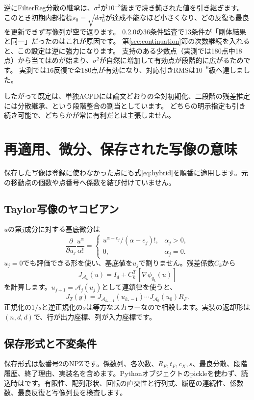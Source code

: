 \documentclass[a4paper,11pt]{article}
\newcommand{\code}[1]{\texttt{\detokenize{#1}}}
\numberwithin{equation}{section}
\begin{document}
逆にFilterReg分散の継承は、\(\sigma^2\)が\(10^{-8}\)級まで焼き鈍された値を引き継ぎます。
このとき初期内部指標\(s_0=\sqrt{d\sigma_0^2}\)が達成不能なほど小さくなり、どの反復も最良を更新できず写像列が空で返ります。
0.2.0の36条件監査で13条件が「剛体結果と同一」だったのはこれが原因です。
第\ref{sec:continuation}節の次数継続を入れると、この設定は逆に強力になります。
支持のある少数点（実測では180点中18点）から当てはめが始まり、\(\sigma^2\)が自然に増加して有効点が段階的に広がるためです。
実測では16反復で全180点が有効になり、対応付きRMSは\(10^{-6}\)級へ達しました。

したがって既定は、単独ACPDには論文どおりの全対初期化、二段階の残差推定には分散継承、という段階整合の割当としています。
どちらの明示指定も引き続き可能で、どちらかが常に有利だとは主張しません。

\section{再適用、微分、保存された写像の意味}\label{sec:mapping}
保存した写像は登録に使わなかった点にも式\eqref{eq:hybrid}を順番に適用します。元の移動点の個数や点番号へ係数を結び付けていません。

\subsection{Taylor写像のヤコビアン}
\(u\)の第\(j\)成分に対する基底微分は
\begin{equation}
 \frac{\partial}{\partial u_j}\frac{u^\alpha}{\alpha!}=
 \begin{cases}
 u^{\alpha-e_j}/(\alpha-e_j)!,&\alpha_j>0,\\
 0,&\alpha_j=0.
 \end{cases}
\end{equation}
\(u_j=0\)でも評価できる形を使い、基底値を\(u_j\)で割りません。残差係数\(C_k\)から
\begin{equation}
 J_{\mathcal A_k}(u)=I_d+C_k^T\,[\nabla\phi_{q_k}(u)]
\end{equation}
を計算します。\(u_{j+1}=\mathcal A_j(u_j)\)として連鎖律を使うと、
\begin{equation}
 J_T(y)=J_{\mathcal A_{k_*-1}}(u_{k_*-1})\cdots
         J_{\mathcal A_0}(u_0)R_F.
\end{equation}
正規化の\(1/s\)と逆正規化の\(s\)は等方なスカラーなので相殺します。実装の返却形は\((n,d,d)\)で、行が出力座標、列が入力座標です。

\subsection{保存形式と不変条件}
保存形式は版番号2のNPZです。係数列、各次数、\(R_F,t_F,c_X,s\)、最良分散、段階履歴、終了理由、実装名を含めます。Pythonオブジェクトのpickleを使わず、読込時は\code{allow_pickle=False}です。有限性、配列形状、回転の直交性と行列式、履歴の連続性、係数数、最良反復と写像列長を検査します。
\end{document}
